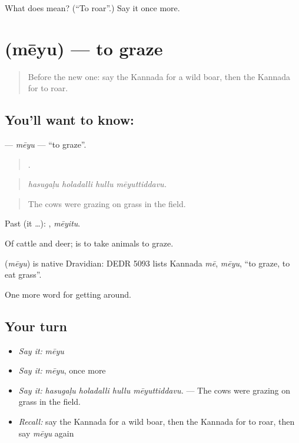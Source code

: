 \begin{tcolorbox}[breakable,colback=teal!4,colframe=teal!35!black,title={Before you move on}]
What does  mean? (\textquotedblleft{}To roar\textquotedblright{}.) Say it once more.
\end{tcolorbox}
\section[\texorpdfstring{\kn{ಮೇಯು} (mēyu)}{ಮೇಯು (mēyu)}]{ (mēyu) — to graze}

\label{lesson:KA-C477-meyu}



\begin{quote}
Before the new one: say the Kannada for a wild boar, then the Kannada for to roar.
\end{quote}

\subsection*{You'll want to know: }
\textbf{} — \emph{mēyu} — \textquotedblleft{}to graze\textquotedblright{}.

\begin{quote}
   .
\end{quote}

\begin{quote}
\emph{hasugaḷu holadalli hullu mēyuttiddavu.}
\end{quote}

\begin{quote}
The cows were grazing on grass in the field.
\end{quote}

Past (it …): , \emph{mēyitu}.

Of cattle and deer;  is to take animals to graze.

\begin{cousinweb}
\textbf{} (\emph{mēyu}) is native Dravidian: DEDR 5093 lists Kannada \emph{mē}, \emph{mēyu}, \textquotedblleft{}to graze, to eat grass\textquotedblright{}.
\end{cousinweb}

\begin{grammarlens}[title={What you've built}]
One more word for getting around.
\end{grammarlens}

\subsection*{Your turn}
\begin{itemize}
\raggedright
  \item \emph{Say it:} \emph{mēyu}
  \item \emph{Say it:} \emph{mēyu}, once more
  \item \emph{Say it:} \emph{hasugaḷu holadalli hullu mēyuttiddavu.} — The cows were grazing on grass in the field.
  \item \emph{Recall:} say the Kannada for a wild boar, then the Kannada for to roar, then say \emph{mēyu} again
\end{itemize}

